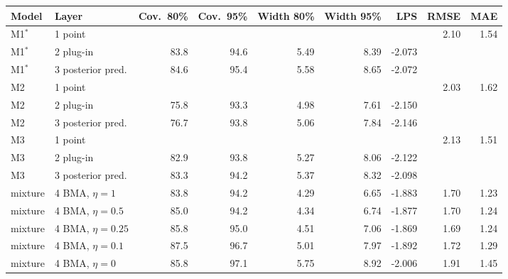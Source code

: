 \begin{tabular}{llrrrrrrr}
\toprule
Model & Layer & Cov.\ 80\% & Cov.\ 95\% & Width 80\% & Width 95\% & LPS & RMSE & MAE \\
\midrule
M1$^*$ & 1 point &  &  &  &  &  & 2.10 & 1.54 \\
M1$^*$ & 2 plug-in & 83.8 & 94.6 & 5.49 & 8.39 & -2.073 &  &  \\
M1$^*$ & 3 posterior pred. & 84.6 & 95.4 & 5.58 & 8.65 & -2.072 &  &  \\
\addlinespace
M2 & 1 point &  &  &  &  &  & 2.03 & 1.62 \\
M2 & 2 plug-in & 75.8 & 93.3 & 4.98 & 7.61 & -2.150 &  &  \\
M2 & 3 posterior pred. & 76.7 & 93.8 & 5.06 & 7.84 & -2.146 &  &  \\
\addlinespace
M3 & 1 point &  &  &  &  &  & 2.13 & 1.51 \\
M3 & 2 plug-in & 82.9 & 93.8 & 5.27 & 8.06 & -2.122 &  &  \\
M3 & 3 posterior pred. & 83.3 & 94.2 & 5.37 & 8.32 & -2.098 &  &  \\
\addlinespace
mixture & 4 BMA, $\eta=1$ & 83.8 & 94.2 & 4.29 & 6.65 & -1.883 & 1.70 & 1.23 \\
mixture & 4 BMA, $\eta=0.5$ & 85.0 & 94.2 & 4.34 & 6.74 & -1.877 & 1.70 & 1.24 \\
mixture & 4 BMA, $\eta=0.25$ & 85.8 & 95.0 & 4.51 & 7.06 & -1.869 & 1.69 & 1.24 \\
mixture & 4 BMA, $\eta=0.1$ & 87.5 & 96.7 & 5.01 & 7.97 & -1.892 & 1.72 & 1.29 \\
mixture & 4 BMA, $\eta=0$ & 85.8 & 97.1 & 5.75 & 8.92 & -2.006 & 1.91 & 1.45 \\
\bottomrule
\end{tabular}
